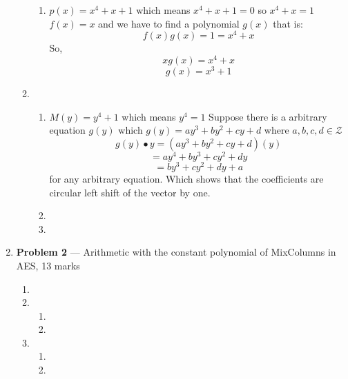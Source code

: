 \documentclass[11pt]{article}
\theoremstyle{definition}
\begin{document}
\begin{enumerate}
\begin{enumerate}
\begin{enumerate}
			\item %
			$p(x) = x^{4}+x+1$ which means $x^{4}+x+1 = 0$ so $x^4+x=1$\newline
			$f(x) = x$ and we have to find a polynomial $g(x)$ that is:
			\[f(x)g(x) = 1 = x^4 + x\] So,
			\[xg(x) = x^4 + x\]
			\[g(x) = x^3 + 1\]
		
		\end{enumerate}
	
		\item %
		
		\begin{enumerate}
		
			\item %
			$M(y) = y^4 + 1$ which means $y^4 =1 $
			Suppose there is a arbitrary equation $g(y)$ which $g(y) = ay^3+by^2+cy+d$ where $a,b,c,d \in \mathcal{Z} $ 
			\[g(y) \bullet y  = (ay^3+by^2+cy+d)(y)\]
			\[=ay^4+by^3+cy^2+dy\]
			\[=by^3 + cy^2 +dy + a\]
			for any arbitrary equation. Which shows that the coefficients are circular left shift of the vector by one.
				
			\item %
				
			\item %
		\end{enumerate}
	\end{enumerate}
	
	
	\item[] \textbf{Problem 2} ---  Arithmetic with the constant polynomial of {\sc MixColumns} in
	    AES, 13 marks
	
	\begin{enumerate}
	
		\item %
		
		\item %
		
		\begin{enumerate}
			\item %
			
			\item %
		\end{enumerate}
		
		\item %
		
		\begin{enumerate}
			\item %
			
			\item %
		\end{enumerate}
	\end{enumerate}
	

\end{enumerate}
\end{document}
